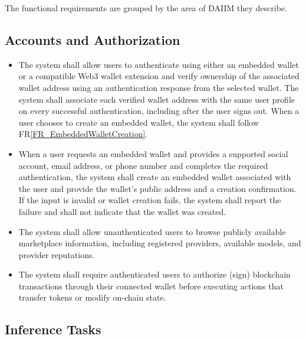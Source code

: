 \documentclass[12pt]{article}
\newcounter{reqnum} %
\newcommand{\rref}[1]{FR\ref{#1}}
\begin{document}

The functional requirements are grouped by the area of DAIIM they describe.

\subsection{Accounts and Authorization}

\noindent \begin{itemize}

\item[FR\refstepcounter{reqnum}\thereqnum \label{FR_WalletAuthentication}:] The system shall allow users to authenticate using either an embedded wallet or a compatible Web3 wallet extension and verify ownership of the associated wallet address using an authentication response from the selected wallet. The system shall associate each verified wallet address with the same user profile on every successful authentication, including after the user signs out. When a user chooses to create an embedded wallet, the system shall follow \rref{FR_EmbeddedWalletCreation}.

\item[FR\refstepcounter{reqnum}\thereqnum \label{FR_EmbeddedWalletCreation}:] When a user requests an embedded wallet and provides a supported social account, email address, or phone number and completes the required authentication, the system shall create an embedded wallet associated with the user and provide the wallet's public address and a creation confirmation. If the input is invalid or wallet creation fails, the system shall report the failure and shall not indicate that the wallet was created.

\item[FR\refstepcounter{reqnum}\thereqnum \label{FR_PublicAccess}:] The system shall allow unauthenticated users to browse publicly available marketplace information, including registered providers, available models, and provider reputations.

\item[FR\refstepcounter{reqnum}\thereqnum \label{FR_TransactionAuthorization}:] The system shall require authenticated users to authorize (sign) blockchain transactions through their connected wallet before executing actions that transfer tokens or modify on-chain state.

\end{itemize}

\subsection{Inference Tasks}
\end{document}
